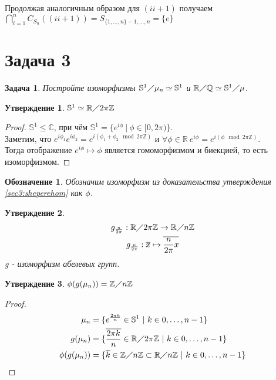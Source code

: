 \documentclass{article}
\newtheorem{task}{Задача}
\newtheorem{statement}{Утверждение}
\newtheorem{localdf}{Обозначение}
\newcommand{\srange}[2]{\{#1, \dots, #2\}}
\newcommand{\range}[2]{#1, \dots, #2}
\newcommand{\subgroup}{\leq}
\newcommand{\isomorphic}{\simeq}
\newcommand{\sphere}[1]{\mathbb{S}^{#1}}
\newcommand{\quotient}[2]{#1 \diagup #2}
\newcommand{\R}{\mathbb{R}}
\newcommand{\Q}{\mathbb{Q}}
\newcommand{\Z}{\mathbb{Z}}
\newcommand{\Zn}[1]{\quotient{\Z}{#1\Z}}
\newcommand{\Complex}{\mathbb{C}}
\newcommand{\class}[1]{\overline{#1}}
\begin{document}
Продолжая аналогичным образом для $(i i+1)$ получаем $\bigcap_{i = 1}^{n}C_{S_n}((i i+1)) = S_{\srange{1}{n} - \range{1}{n}} = \{e\}$

\section*{Задача 3}

\begin{task}
    Постройте изоморфизмы 
    $\quotient{\sphere{1}}{\mu_n} \isomorphic \sphere{1}$ и 
    $\quotient{\R}{\Q} \isomorphic \quotient{\sphere{1}}{\mu}$.
\end{task}

\begin{statement}
$\sphere{1} \isomorphic \quotient{\R}{2\pi\Z}$
\end{statement}

\begin{proof}
\label{sec3:sheperehom}
$\sphere{1} \subgroup \Complex$, при чём 
$\sphere{1} = \{ e^{i \phi} ~ | ~ \phi \in [0, 2 \pi)\}$. \\
Заметим, что $e^{i \phi_1} e^{i \phi_2} = e^{i(\phi_1 + \phi_2 \mod{2\pi\Z})}$ и
$ \forall \phi \in \R ~ e^{i \phi} = e^{i (\phi \mod{2\pi\Z})}$. \\
Тогда отображение $e^{i \phi} \mapsto \phi$ является гомоморфизмом и биекцией, то
есть изоморфизмом.
\end{proof}

\begin{localdf}
    Обозначим изоморфизм из доказательства утверждения \ref{sec3:sheperehom} как $\phi$.
\end{localdf}

\begin{statement}
    \begin{gather*}
        g_{\frac{n}{2\pi}}: \quotient{\R}{2 \pi \Z} \to \quotient{\R}{n\Z} \\
        g_{\frac{n}{2\pi}}: \class{x} \mapsto \class{\frac{n}{2\pi} x}
    \end{gather*}
    g - изоморфизм абелевых групп.
\end{statement}

\begin{statement}
$\phi ( g (\mu_n) ) = \Zn{n}$
\end{statement}

\begin{proof}
\begin{align*}
\mu_n &= \{ e^{\frac{2 \pi k}{n}} \in \sphere{1} ~ | ~ k \in \range{0}{n - 1}\} \\
g(\mu_n) &= \{\class{\frac{2 \pi k}{n}} \in \quotient{\R}{2 \pi \Z} ~ | ~ k \in \range{0}{n - 1}\} \\
\phi ( g (\mu_n) ) &= \{\class{k} \in \Zn{n} \subset \quotient{\R}{n \Z} ~ | ~ k \in \range{0}{n - 1}\}
\end{align*}
\end{proof}
\end{document}
